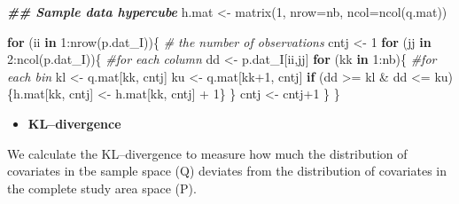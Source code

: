 \documentclass[
  10pt,
  b5paper,
  oneside]{book}
\newenvironment{Shaded}{\begin{snugshade}}{\end{snugshade}}
\newcommand{\AttributeTok}[1]{\textcolor[rgb]{0.77,0.63,0.00}{#1}}
\newcommand{\CommentTok}[1]{\textcolor[rgb]{0.56,0.35,0.01}{\textit{#1}}}
\newcommand{\ControlFlowTok}[1]{\textcolor[rgb]{0.13,0.29,0.53}{\textbf{#1}}}
\newcommand{\DecValTok}[1]{\textcolor[rgb]{0.00,0.00,0.81}{#1}}
\newcommand{\DocumentationTok}[1]{\textcolor[rgb]{0.56,0.35,0.01}{\textbf{\textit{#1}}}}
\newcommand{\FunctionTok}[1]{\textcolor[rgb]{0.00,0.00,0.00}{#1}}
\newcommand{\NormalTok}[1]{#1}
\newcommand{\OtherTok}[1]{\textcolor[rgb]{0.56,0.35,0.01}{#1}}
\newcommand{\SpecialCharTok}[1]{\textcolor[rgb]{0.00,0.00,0.00}{#1}}
\providecommand{\tightlist}{%
  \setlength{\itemsep}{0pt}\setlength{\parskip}{0pt}}
\begin{document}
\begin{Shaded}
\begin{Highlighting}[]
\DocumentationTok{\#\# Sample data hypercube}
\NormalTok{  h.mat }\OtherTok{\textless{}{-}} \FunctionTok{matrix}\NormalTok{(}\DecValTok{1}\NormalTok{, }\AttributeTok{nrow=}\NormalTok{nb, }\AttributeTok{ncol=}\FunctionTok{ncol}\NormalTok{(q.mat))}
  
  \ControlFlowTok{for}\NormalTok{ (ii }\ControlFlowTok{in} \DecValTok{1}\SpecialCharTok{:}\FunctionTok{nrow}\NormalTok{(p.dat\_I))\{ }\CommentTok{\# the number of observations}
\NormalTok{    cntj }\OtherTok{\textless{}{-}} \DecValTok{1} 
    \ControlFlowTok{for}\NormalTok{ (jj }\ControlFlowTok{in} \DecValTok{2}\SpecialCharTok{:}\FunctionTok{ncol}\NormalTok{(p.dat\_I))\{ }\CommentTok{\#for each column}
\NormalTok{      dd }\OtherTok{\textless{}{-}}\NormalTok{ p.dat\_I[ii,jj]  }
      \ControlFlowTok{for}\NormalTok{ (kk }\ControlFlowTok{in} \DecValTok{1}\SpecialCharTok{:}\NormalTok{nb)\{  }\CommentTok{\#for each bin}
\NormalTok{        kl }\OtherTok{\textless{}{-}}\NormalTok{ q.mat[kk, cntj] }
\NormalTok{        ku }\OtherTok{\textless{}{-}}\NormalTok{ q.mat[kk}\SpecialCharTok{+}\DecValTok{1}\NormalTok{, cntj] }
        \ControlFlowTok{if}\NormalTok{ (dd }\SpecialCharTok{\textgreater{}=}\NormalTok{ kl }\SpecialCharTok{\&}\NormalTok{ dd }\SpecialCharTok{\textless{}=}\NormalTok{ ku)\{h.mat[kk, cntj] }\OtherTok{\textless{}{-}}\NormalTok{ h.mat[kk, cntj] }\SpecialCharTok{+} \DecValTok{1}\NormalTok{\}}
\NormalTok{      \}}
\NormalTok{      cntj }\OtherTok{\textless{}{-}}\NormalTok{ cntj}\SpecialCharTok{+}\DecValTok{1}
\NormalTok{    \}}
\NormalTok{  \}}
\end{Highlighting}
\end{Shaded}

\begin{itemize}
\tightlist
\item
  \textbf{KL--divergence}
\end{itemize}

We calculate the KL--divergence to measure how much the distribution of covariates in tbe sample space (Q) deviates from the distribution of covariates in the complete study area space (P).
\end{document}
